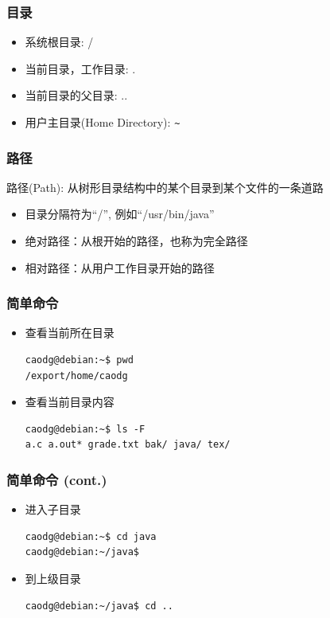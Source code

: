 \documentclass[compress]{beamer}
\begin{document}
\begin{frame}[containsverbatim]
\frametitle{目录}
\begin{itemize}
\item 系统根目录: \alert{/}
\item 当前目录，工作目录: \alert{.}
\item 当前目录的父目录: \alert{..}
\item 用户主目录(Home Directory): \verb=~=
  \end{itemize}
  
\end{frame}


\begin{frame}
  \frametitle{路径}
路径(Path): 从树形目录结构中的某个目录到某个文件的一条道路
\begin{itemize}
    \item 目录分隔符为``/'', 例如``/usr/bin/java''
    \item 绝对路径：从根开始的路径，也称为完全路径
    \item 相对路径：从用户工作目录开始的路径
\end{itemize}

\end{frame}

\begin{frame}[containsverbatim]
\frametitle{简单命令}

\begin{itemize}
\item 查看当前所在目录\\[0.5ex]
\begin{Verbatim}
caodg@debian:~$ pwd
/export/home/caodg
\end{Verbatim}

\item 查看当前目录内容\\[0.5ex]
\begin{Verbatim}
caodg@debian:~$ ls -F
a.c a.out* grade.txt bak/ java/ tex/
\end{Verbatim}

\end{itemize}


\end{frame}


\begin{frame}[containsverbatim]
\frametitle{简单命令 (cont.)}

\begin{itemize}
\item 进入子目录\\[0.5ex]
\begin{Verbatim}
caodg@debian:~$ cd java
caodg@debian:~/java$
\end{Verbatim}

\item 到上级目录\\[0.5ex]
\begin{Verbatim}
caodg@debian:~/java$ cd ..
\end{Verbatim}

\end{itemize}

\end{frame}
\end{document}
